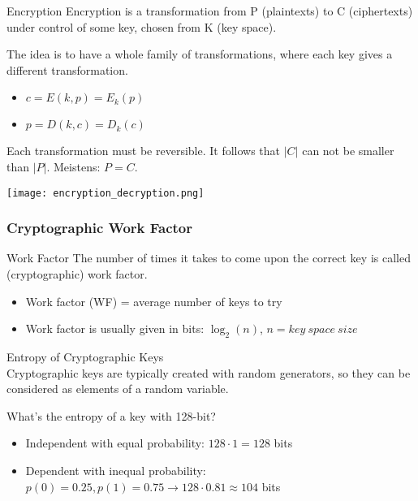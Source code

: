 \begin{minipage}{0.65\linewidth}
\begin{theorem}{Encryption}
    Encryption is a transformation from P (plaintexts) to C (ciphertexts) under control of some key, chosen from K (key space).
    
    The idea is to have a whole family of transformations, where each key gives a different transformation.
    \begin{itemize}
        \item $c = E(k, p) = E_k(p)$
        \item $p = D(k, c) = D_k(c)$
    \end{itemize}
    
    Each transformation must be reversible. It follows that $|C|$ can not be smaller than $|P|$. Meistens: $P = C$.
\end{theorem}
\end{minipage}
\begin{minipage}{0.35\linewidth}
\texttt{[image: encryption\_decryption.png]}
\end{minipage}

\raggedcolumns


\subsubsection{Cryptographic Work Factor}


\begin{definition}{Work Factor}
    The number of times it takes to come upon the correct key is called (cryptographic) work factor.
    \begin{itemize}
        \item Work factor (WF) = average number of keys to try
        \item Work factor is usually given in bits: $\log_2(n)$, $n = key\ space\ size$
    \end{itemize}
\end{definition}


\begin{concept}{Entropy of Cryptographic Keys}\\
    Cryptographic keys are typically created with random generators, so they can be considered as elements of a random variable.
    
    What's the entropy of a key with 128-bit?
    \begin{itemize}
        \item Independent with equal probability: $128 \cdot 1 = 128$ bits
        \item Dependent with inequal probability: $p(0) = 0.25, p(1) = 0.75 \rightarrow 128 \cdot 0.81 \approx 104$ bits
    \end{itemize}
\end{concept}

